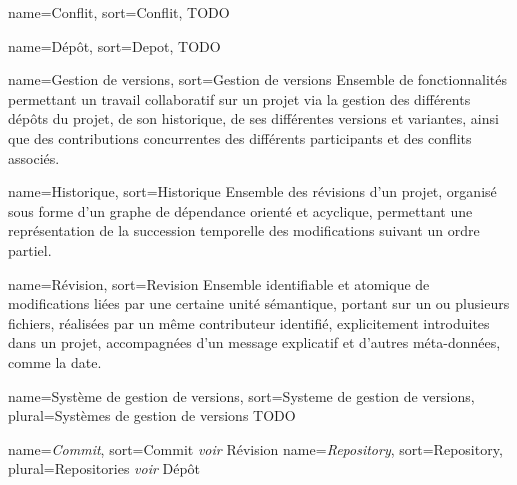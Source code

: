 
{
name=Conflit,
sort=Conflit,
}
{TODO}

{
name=Dépôt,
sort=Depot,
}
{TODO}

{
name=Gestion de versions,
sort=Gestion de versions
}
{Ensemble de fonctionnalités permettant un travail collaboratif sur un projet via la gestion des différents dépôts du projet, de son historique, de ses différentes versions et variantes, ainsi que des contributions concurrentes des différents participants et des conflits associés.}

{
name=Historique,
sort=Historique
}
{Ensemble des révisions d'un projet, organisé sous forme d'un graphe de dépendance orienté et acyclique, permettant une représentation de la succession temporelle des modifications suivant un ordre partiel.}

{
name=Révision,
sort=Revision
}
{Ensemble identifiable et atomique de modifications liées par une certaine unité sémantique, portant sur un ou plusieurs fichiers, réalisées par un même contributeur identifié, explicitement introduites dans un projet, accompagnées d'un message explicatif et d'autres méta-données, comme la date.}

{
  name=Système de gestion de versions,
  sort=Systeme de gestion de versions,
  plural=Systèmes de gestion de versions
}
{TODO}

{
name={\it Commit\/},
sort=Commit
}
{{\it voir\/} Révision}
{
  name={\it Repository\/},
  sort=Repository,
  plural=Repositories
}
{{\it voir\/} Dépôt}